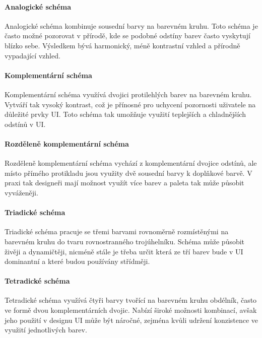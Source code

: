 \paragraph{Analogické schéma} Analogické schéma kombinuje sousední barvy na barevném kruhu. Toto schéma je často možné pozorovat v přírodě, kde se podobné odstíny barev často vyskytují blízko sebe. Výsledkem bývá harmonický, méně kontrastní vzhled a přírodně vypadající vzhled. \cite{FigmaColorWheel}

\paragraph{Komplementární schéma} Komplementární schéma využívá dvojici protilehlých barev na barevném kruhu. Vytváří tak vysoký kontrast, což je přínosné pro uchycení pozornosti uživatele na důležité prvky UI. Toto schéma tak umožňuje využití teplejších a chladnějších odstínů v UI.  \cite{FigmaColorWheel}

\paragraph{Rozděleně komplementární schéma} Rozděleně komplementární schéma vychází z komplementární dvojice odstínů, ale místo přímého protikladu jsou využity dvě sousední barvy k doplňkové barvě. V praxi tak designeři mají možnost využít více barev a paleta tak může působit vyváženěji. \cite{FigmaColorWheel} \cite{FigmaWhatIsColorTheory}

\paragraph{Triadické schéma} Triadické schéma pracuje se třemi barvami rovnoměrně rozmístěnými na barevném kruhu do tvaru rovnostranného trojúhelníku. Schéma může působit živěji a dynamičtěji, nicméně stále je třeba určit která ze tří barev bude v UI dominantní a které budou používány střídměji. \cite{FigmaColorWheel} 

\paragraph{Tetradické schéma} Tetradické schéma využívá čtyři barvy tvořící na barevném kruhu obdélník, často ve formě dvou komplementárních dvojic. Nabízí široké možnosti kombinací, avšak jeho použití v designu UI může být náročné, zejména kvůli udržení konzistence ve využití jednotlivých barev. \cite{FigmaColorWheel} 

